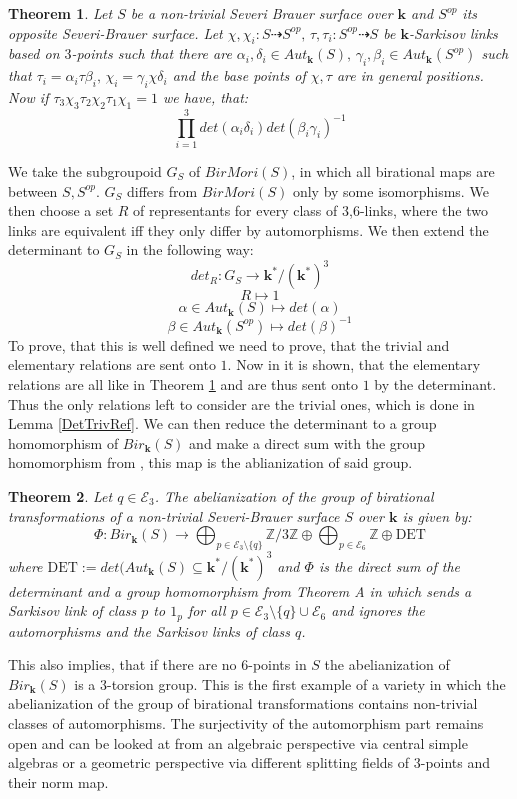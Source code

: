 \documentclass[12pt, oneside, reqno]{amsart}
\newtheorem{maintheorem}{Theorem}
\begin{document}
\begin{maintheorem} \label{MainA}
    Let $S$ be a non-trivial Severi Brauer surface over $\textbf{k}$ and $S^{op}$ its opposite Severi-Brauer surface. Let $\chi, \chi_i: S \dashrightarrow S^{op}, \, \tau, \tau_i:S^{op} \dashrightarrow S$ be $\textbf{k}$-Sarkisov links based on $3$-points such that there are $\alpha_i, \delta_i \in Aut_{\textbf{k}}(S), \, \gamma_i, \beta_i \in Aut_{\textbf{k}}(S^{op})$ such that $\tau_i = \alpha_i \tau \beta_i, \, \chi_i = \gamma_i \chi \delta_i$ and the base points of $\chi, \tau$ are in general positions. Now if $\tau_3 \chi_3 \tau_2 \chi_2 \tau_1 \chi_1 = 1$ we have, that: \[\prod_{i=1}^3 det(\alpha_i\delta_i)det(\beta_i\gamma_i)^{-1}\]
\end{maintheorem}
\noindent We take the subgroupoid $G_S$ of $BirMori(S)$, in which all birational maps are between $S,S^{op}$. $G_S$ differs from $BirMori(S)$ only by some isomorphisms. We then choose a set $R$ of representants for every class of $3$,$6$-links, where the two links are equivalent iff they only differ by automorphisms. We then extend the determinant to $G_S$ in the following way: \[det_R: G_S \rightarrow \textbf{k}^*/(\textbf{k}^*)^3\] \[R \mapsto 1\] \[\alpha \in Aut_{\textbf{k}}(S) \mapsto det(\alpha)\] \[\beta \in Aut_{\textbf{k}}(S^{op}) \mapsto det(\beta)^{-1}\] To prove, that this is well defined we need to prove, that the trivial and elementary relations are sent onto $1$. Now in \cite{BSY} it is shown, that the elementary relations are all like in Theorem \ref{MainA} and are thus sent onto $1$ by the determinant. Thus the only relations left to consider are the trivial ones, which is done in Lemma \ref{DetTrivRef}. We can then reduce the determinant to a group homomorphism of $Bir_{\textbf{k}}(S)$ and make a direct sum with the group homomorphism from \cite{BSY}, this map is the ablianization of said group.
\begin{maintheorem} \label{MainB}
Let $q \in \mathcal{E}_3$. The abelianization of the group of birational transformations of a non-trivial Severi-Brauer surface $S$ over $\textbf{k}$ is given by: 
    \[\Phi:Bir_{\textbf{k}}(S) \rightarrow \bigoplus_{p \in \mathcal{E}_3 \setminus \{ q \}} \mathbb{Z}/3\mathbb{Z} \oplus \bigoplus_{p \in \mathcal{E}_6} \mathbb{Z} \oplus \textrm{DET}\]
    where $\textrm{DET} := det(Aut_{\textbf{k}}(S) \subseteq \textbf{k}^* / (\textbf{k}^*)^3$ and $\Phi$ is the direct sum of the determinant and a group homomorphism from Theorem A in \cite{BSY} which sends a Sarkisov link of class $p$ to $1_p$ for all $p \in \mathcal{E}_3 \setminus \{ q \} \cup \mathcal{E}_6$ and ignores the automorphisms and the Sarkisov links of class $q$.
\end{maintheorem}
\noindent This also implies, that if there are no $6$-points in $S$ the abelianization of $Bir_{\textbf{k}}(S)$ is a $3$-torsion group. This is the first example of a variety in which the abelianization of the group of birational transformations contains non-trivial classes of automorphisms. The surjectivity of the automorphism part remains open and can be looked at from an algebraic perspective via central simple algebras or a geometric perspective via different splitting fields of $3$-points and their norm map.
\end{document}
